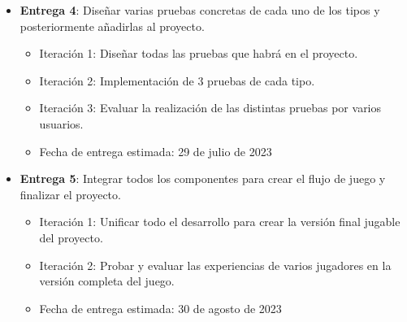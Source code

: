 \begin{itemize}
	\item{\textbf{Entrega 4}: Diseñar varias pruebas concretas de cada uno de los tipos y posteriormente añadirlas al proyecto.
	\begin{itemize}
		\item{Iteración 1: Diseñar todas las pruebas que habrá en el proyecto.}
		\item{Iteración 2: Implementación de 3 pruebas de cada tipo.}
		\item{Iteración 3: Evaluar la realización de las distintas pruebas por varios usuarios.}
		\item{Fecha de entrega estimada: 29 de julio de 2023}
	\end{itemize}	
	}

	\item{\textbf{Entrega 5}: Integrar todos los componentes para crear el flujo de juego y finalizar el proyecto.
	\begin{itemize}
		\item{Iteración 1: Unificar todo el desarrollo para crear la versión final jugable del proyecto.}
		\item{Iteración 2: Probar y evaluar las experiencias de varios jugadores en la versión completa del juego.}
		\item{Fecha de entrega estimada: 30 de agosto de 2023}
	\end{itemize}	
	}
	
\end{itemize}







\chapterend